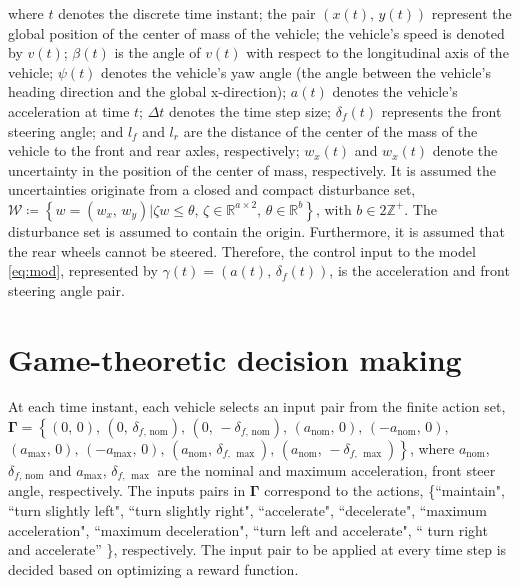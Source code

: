 \documentclass[10pt,journal]{IEEEtran}
\begin{document}
	\noindent where  $t$ denotes the discrete time instant; the pair $\left(x\left(t\right),\,y\left(t\right)\right)$  represent the global position of the center of mass of the vehicle; the vehicle's speed is denoted by $v\left(t\right)$; 	$\beta\left(t\right)$ is the angle of $v\left(t\right)$ with respect to the longitudinal axis of the vehicle; $\psi\left(t\right)$ denotes the vehicle’s yaw angle (the angle between the vehicle’s heading direction and the global x-direction); $a\left(t\right)$ denotes the vehicle’s acceleration at time $t$;  $\Delta t$ denotes the time step size; $\delta_f\left(t\right)$  represents the front steering angle; and  $l_f$  and $l_r$  are the distance of the center of the mass of the vehicle to the front and rear axles, respectively; $w_x\left(t\right)$  and $w_x\left(t\right)$ denote the uncertainty in the position of the center of mass, respectively. It is assumed the uncertainties originate from a closed and compact disturbance set, ${\mathcal{W}} \coloneqq  \left\{ w = \left(w_x,\,w_y\right) |\zeta w\leq\theta,\,\zeta\in\mathbb{R}^{a\times 2},\,\theta\in\mathbb{R}^{b}\right\}$, with $b \in 2\mathbb{Z}^{+}$. The disturbance set is assumed to contain the origin. Furthermore, it is assumed that the rear wheels cannot be steered. Therefore, the control input to the model \eqref{eq:mod}, represented by $\gamma\left(t\right) = \left(a\left(t\right),\, \delta_f\left(t\right)\right)$, is the acceleration and front steering angle pair. 

	

	
	\section{Game-theoretic decision making}
	\label{sec:controller}

	At each time instant, each vehicle selects an input pair from the finite action set, $ \boldsymbol{\Gamma} = \left\{\left(0,\, 0\right),\,\left(0,\, \delta_{f,\,\textrm{nom}}\right),\,\left(0,\, -\delta_{f,\,\textrm{nom}}\right),\,\left(a_{\textrm{nom}},\, 0\right),\,\left(-a_{\textrm{nom}},\, 0\right),\right.$ $\left.\left(a_{\max},\, 0\right),\,\left(-a_{\max},\, 0\right),\,\left(a_{\textrm{nom}},\, \delta_{f,\,\max}\right),\,\left(a_{\textrm{nom}},\, -\delta_{f,\,\max}\right)\right\}$, where $a_{\textrm{nom}}$, $\delta_{f,\,\textrm{nom}}$ and $a_{\max}$, $\delta_{f,\,\max}$ are the nominal and maximum acceleration, front steer angle, respectively. The inputs pairs in $ \boldsymbol{\Gamma}$ correspond to the actions, \{``maintain", ``turn slightly left", ``turn slightly right", ``accelerate", ``decelerate", ``maximum acceleration", ``maximum deceleration", ``turn left and accelerate", `` turn right and accelerate'' \}, respectively. The input pair to be applied at every time step is decided based on optimizing a reward function.
	
\end{document}

